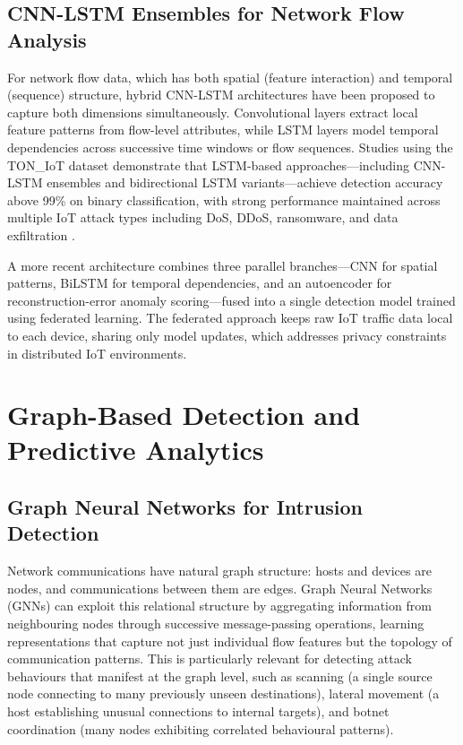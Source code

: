 \documentclass[12pt,a4paper]{report}
\begin{document}
\subsection{CNN-LSTM Ensembles for Network Flow Analysis}
\label{sec:cnnlstm-lit}

For network flow data, which has both spatial (feature interaction) and temporal (sequence) structure, hybrid CNN-LSTM architectures have been proposed to capture both dimensions simultaneously. Convolutional layers extract local feature patterns from flow-level attributes, while LSTM layers model temporal dependencies across successive time windows or flow sequences. Studies using the TON\_IoT dataset demonstrate that LSTM-based approaches---including CNN-LSTM ensembles and bidirectional LSTM variants---achieve detection accuracy above 99\% on binary classification, with strong performance maintained across multiple IoT attack types including DoS, DDoS, ransomware, and data exfiltration \citep{ferrag2022,imrana2021}.

A more recent architecture \citep{popoola2021} combines three parallel branches---CNN for spatial patterns, BiLSTM for temporal dependencies, and an autoencoder for reconstruction-error anomaly scoring---fused into a single detection model trained using federated learning. The federated approach keeps raw IoT traffic data local to each device, sharing only model updates, which addresses privacy constraints in distributed IoT environments.

\section{Graph-Based Detection and Predictive Analytics}
\label{sec:graphbased}

\subsection{Graph Neural Networks for Intrusion Detection}
\label{sec:gnn-lit}

Network communications have natural graph structure: hosts and devices are nodes, and communications between them are edges. Graph Neural Networks (GNNs) can exploit this relational structure by aggregating information from neighbouring nodes through successive message-passing operations, learning representations that capture not just individual flow features but the topology of communication patterns. This is particularly relevant for detecting attack behaviours that manifest at the graph level, such as scanning (a single source node connecting to many previously unseen destinations), lateral movement (a host establishing unusual connections to internal targets), and botnet coordination (many nodes exhibiting correlated behavioural patterns).
\end{document}
